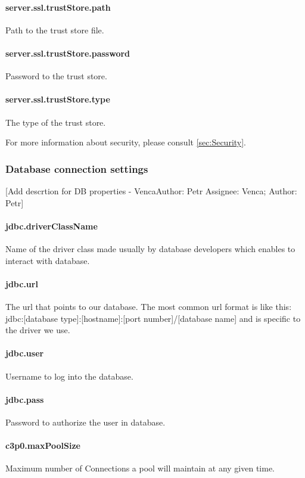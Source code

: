 \documentclass[12pt,a4paper]{report}
\makeatletter
\newcommand{\comment}[3][\@empty]{
  {\color{magenta}[#3 - }
  {\color{green}\ifx\@empty#1\relax Author: #2 \else Assignee: #1; Author: #2\fi}{\color{magenta}]}
}
\makeatother
\begin{document}
\paragraph{server.ssl.trustStore.path}
Path to the trust store file.

\paragraph{server.ssl.trustStore.password}
Password to the trust store.

\paragraph{server.ssl.trustStore.type}
The type of the trust store.

\vspace{0.75cm}
For more information about security, please consult \ref{sec:Security}.

\subsubsection{Database connection settings}
\comment[Venca]{Petr}{Add descrtion for DB properties}
\paragraph{jdbc.driverClassName}
Name of the driver class made usually by database developers which enables to interact with database.

\paragraph{jdbc.url}
 The url that points to our database. The most common url format is like this:
jdbc:[database type]:[hostname]:[port number]/[database name]
and is specific to the driver we use.

\paragraph{jdbc.user}
Username to log into the database.
\paragraph{jdbc.pass}
Password to authorize the user in database.

\paragraph{c3p0.maxPoolSize}
Maximum number of Connections a pool will maintain at any given time.
\end{document}
